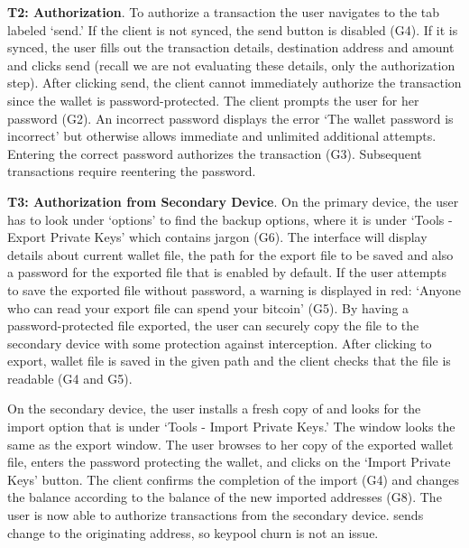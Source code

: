 \textbf{T2: Authorization}.
To authorize a transaction the user navigates to the tab labeled `send.' If the client is not synced, the send button is disabled (G4). If it is synced, the user fills out the transaction details, destination address and amount and clicks send (recall we are not evaluating these details, only the authorization step). After clicking send, the client cannot immediately authorize the transaction since the wallet is password-protected. The client prompts the user for her password (G2). An incorrect password displays the error `The wallet password is incorrect' but otherwise allows immediate and unlimited additional attempts. Entering the correct password authorizes the transaction (G3). Subsequent transactions require reentering the password.


\textbf{T3: Authorization from Secondary Device}.
On the primary device, the user has to look under `options' to find the backup options, where it is under `Tools - Export Private Keys' which contains jargon (G6). The interface will display details about current wallet file, the path for the export file to be saved and also a password for the exported file that is enabled by default. If the user attempts to save the exported file without password, a warning is displayed in red: `Anyone who can read your export file can spend your bitcoin' (G5). By having a password-protected file exported, the user can securely copy the file to the secondary device with some protection against interception. After clicking to export, wallet file is saved in the given path and the client checks that the file is readable (G4 and G5). 

On the secondary device, the user installs a fresh copy of \multibit and looks for the import option that is under `Tools - Import Private Keys.' The window looks the same as the export window. The user browses to her copy of the exported wallet file, enters the password protecting the wallet, and clicks on the `Import Private Keys' button. The client confirms the completion of the import (G4) and changes the balance according to the balance of the new imported addresses (G8). The user is now able to authorize transactions from the secondary device. \multibit sends change to the originating address, so keypool churn is not an issue.


